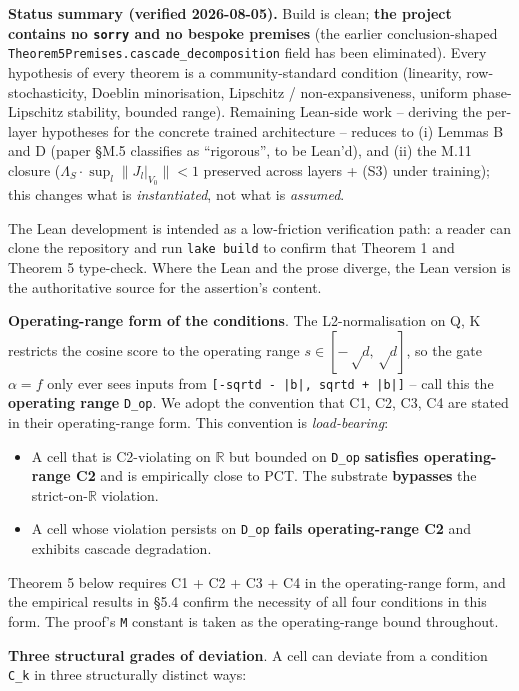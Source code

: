 \documentclass[11pt,a4paper]{article}
\theoremstyle{plain}
\theoremstyle{definition}
\begin{document}
\textbf{Status summary (verified 2026-08-05).} Build is clean; \textbf{the project contains no \texttt{sorry} and no bespoke premises} (the earlier conclusion-shaped \texttt{Theorem5Premises.cascade\_decomposition} field has been eliminated). Every hypothesis of every theorem is a community-standard condition (linearity, row-stochasticity, Doeblin minorisation, Lipschitz / non-expansiveness, uniform phase-Lipschitz stability, bounded range). Remaining Lean-side work -- deriving the per-layer hypotheses for the concrete trained architecture -- reduces to (i) Lemmas B and D (paper \S{}M.5 classifies as ``rigorous'', to be Lean'd), and (ii) the M.11 closure ($\Lambda _S \cdot  \sup_l \|J_l|_{V_0}\| < 1$ preserved across layers + (S3) under training); this changes what is \emph{instantiated}, not what is \emph{assumed}.

The Lean development is intended as a low-friction verification path: a reader can clone the repository and run \texttt{lake build} to confirm that Theorem 1 and Theorem 5 type-check. Where the Lean and the prose diverge, the Lean version is the authoritative source for the assertion's content.

\textbf{Operating-range form of the conditions}. The L2-normalisation on Q, K restricts the cosine score to the operating range $s \in  [-√d, √d]$, so the gate $\alpha  = f$ only ever sees inputs from \texttt{[-sqrtd - |b|, sqrtd + |b|]} -- call this the \textbf{operating range} \texttt{D\_op}. We adopt the convention that C1, C2, C3, C4 are stated in their operating-range form. This convention is \emph{load-bearing}:

\begin{itemize}
  \item A cell that is C2-violating on $\mathbb{R}$ but bounded on \texttt{D\_op} \textbf{satisfies operating-range C2} and is empirically close to PCT. The substrate \textbf{bypasses} the strict-on-$\mathbb{R}$ violation.
  \item A cell whose violation persists on \texttt{D\_op} \textbf{fails operating-range C2} and exhibits cascade degradation.
\end{itemize}

Theorem 5 below requires C1 + C2 + C3 + C4 in the operating-range form, and the empirical results in \S{}5.4 confirm the necessity of all four conditions in this form. The proof's \texttt{M} constant is taken as the operating-range bound throughout.

\textbf{Three structural grades of deviation}. A cell can deviate from a condition \texttt{C\_k} in three structurally distinct ways:
\end{document}
